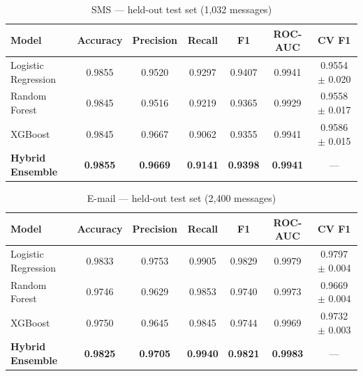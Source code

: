 \documentclass[12pt,a4paper]{report}
\begin{document}
\begin{table}[H]
  \centering
  \caption{SMS --- held-out test set (1,032 messages)}
  \label{tab:sms}
  \setlength{\tabcolsep}{4pt}
  \begin{tabular}{|L{3.3cm}|c|c|c|c|c|c|}
    \hline
    \textbf{Model} & \textbf{Accuracy} & \textbf{Precision} & \textbf{Recall} & \textbf{F1} & \textbf{ROC-AUC} & \textbf{CV F1} \\
    \hline
    Logistic Regression & 0.9855 & 0.9520 & 0.9297 & 0.9407 & 0.9941 & 0.9554 $\pm$ 0.020 \\
    \hline
    Random Forest & 0.9845 & 0.9516 & 0.9219 & 0.9365 & 0.9929 & 0.9558 $\pm$ 0.017 \\
    \hline
    XGBoost & 0.9845 & 0.9667 & 0.9062 & 0.9355 & 0.9941 & 0.9586 $\pm$ 0.015 \\
    \hline
    \textbf{Hybrid Ensemble} & \textbf{0.9855} & \textbf{0.9669} & \textbf{0.9141} & \textbf{0.9398} & \textbf{0.9941} & --- \\
    \hline
  \end{tabular}
\end{table}

\begin{table}[H]
  \centering
  \caption{E-mail --- held-out test set (2,400 messages)}
  \label{tab:email}
  \setlength{\tabcolsep}{4pt}
  \begin{tabular}{|L{3.3cm}|c|c|c|c|c|c|}
    \hline
    \textbf{Model} & \textbf{Accuracy} & \textbf{Precision} & \textbf{Recall} & \textbf{F1} & \textbf{ROC-AUC} & \textbf{CV F1} \\
    \hline
    Logistic Regression & 0.9833 & 0.9753 & 0.9905 & 0.9829 & 0.9979 & 0.9797 $\pm$ 0.004 \\
    \hline
    Random Forest & 0.9746 & 0.9629 & 0.9853 & 0.9740 & 0.9973 & 0.9669 $\pm$ 0.004 \\
    \hline
    XGBoost & 0.9750 & 0.9645 & 0.9845 & 0.9744 & 0.9969 & 0.9732 $\pm$ 0.003 \\
    \hline
    \textbf{Hybrid Ensemble} & \textbf{0.9825} & \textbf{0.9705} & \textbf{0.9940} & \textbf{0.9821} & \textbf{0.9983} & --- \\
    \hline
  \end{tabular}
\end{table}
\end{document}
